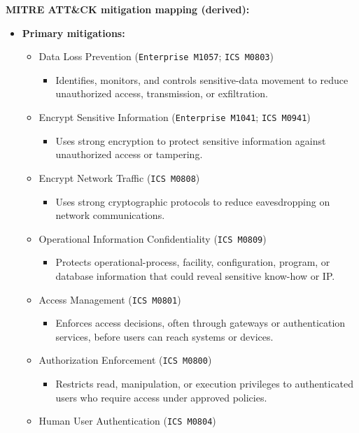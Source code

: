 \documentclass[10pt,a4paper,oneside]{report}
\begin{document}
\textbf{MITRE ATT\&CK mitigation mapping (derived):}

\begin{itemize}
\item \textbf{Primary mitigations:}
\begin{itemize}
\item Data Loss Prevention (\texttt{Enterprise M1057}; \texttt{ICS M0803})
\begin{itemize}
\item Identifies, monitors, and controls sensitive-data movement to reduce unauthorized access, transmission, or exfiltration.
\end{itemize}
\item Encrypt Sensitive Information (\texttt{Enterprise M1041}; \texttt{ICS M0941})
\begin{itemize}
\item Uses strong encryption to protect sensitive information against unauthorized access or tampering.
\end{itemize}
\item Encrypt Network Traffic (\texttt{ICS M0808})
\begin{itemize}
\item Uses strong cryptographic protocols to reduce eavesdropping on network communications.
\end{itemize}
\item Operational Information Confidentiality (\texttt{ICS M0809})
\begin{itemize}
\item Protects operational-process, facility, configuration, program, or database information that could reveal sensitive know-how or IP.
\end{itemize}
\item Access Management (\texttt{ICS M0801})
\begin{itemize}
\item Enforces access decisions, often through gateways or authentication services, before users can reach systems or devices.
\end{itemize}
\item Authorization Enforcement (\texttt{ICS M0800})
\begin{itemize}
\item Restricts read, manipulation, or execution privileges to authenticated users who require access under approved policies.
\end{itemize}
\item Human User Authentication (\texttt{ICS M0804})

\end{itemize}
\end{itemize}
\end{document}
